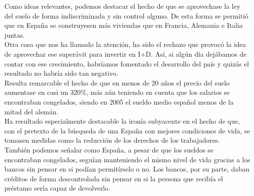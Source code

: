 \documentclass[11pt]{article}
\theoremstyle{plain}
\theoremstyle{definition}
\begin{document}
Como ideas relevantes, podemos destacar el hecho de que se aprovechase
la ley del suelo de forma indiscriminada y sin control alguno. De esta
forma se permitió que en España se construyesen más viviendas que en
Francia, Alemania e Italia juntas.\\

Otra cosa que nos ha llamado la atención, ha sido el rechazo que
provocó la idea de aprovechar ese superávit para invertir en I+D. Así,
si algún día dejábamos de contar con ese crecimiento, habríamos
fomentado el desarrollo del país y quizás el resultado no habría sido
tan negativo.\\

Resulta remarcable el hecho de que en menos de 20 años el precio del
suelo aumentase en casi un 320\%, más aún teniendo en cuenta que los
salarios se encontraban congelados, siendo en 2005 el sueldo medio
español menos de la mitad del alemán.\\

Ha resultado especialmente destacable la ironía subyacente en el hecho
de que, con el pretexto de la búsqueda de una España con mejores
condiciones de vida, se tomasen medidas como la reducción de los
derechos
de los trabajadores.\\

También podemos señalar como España, a pesar de que los sueldos se
encontraban congelados, seguían manteniendo el mismo nivel de vida
gracias a los bancos sin pensar en si podían permitírselo o no. Los
bancos, por su parte, daban créditos de forma descontrolada sin pensar
en si la persona que recibía el préstamo sería
capaz de devolverlo.\\
\end{document}
